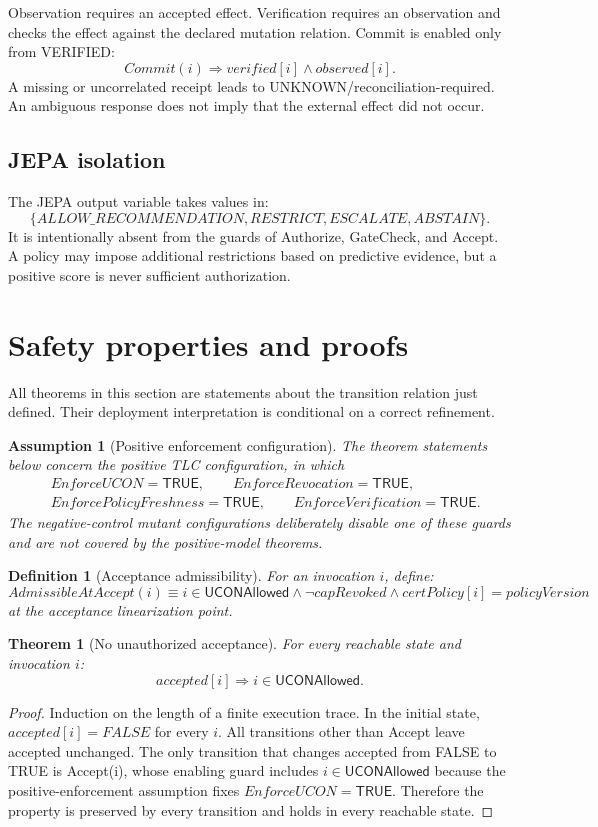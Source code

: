 \documentclass[11pt,a4paper]{article}
\newtheorem{definition}{Definition}[section]
\newtheorem{assumption}{Assumption}[section]
\newtheorem{theorem}{Theorem}[section]
\theoremstyle{remark}
\newcommand{\UCONAllowed}{\mathsf{UCONAllowed}}
\begin{document}
Observation requires an accepted effect. Verification requires an observation and checks the effect against the declared mutation relation. Commit is enabled only from VERIFIED:
\[
Commit(i)\Rightarrow verified[i]\land observed[i].
\]
A missing or uncorrelated receipt leads to UNKNOWN/reconciliation-required. An ambiguous response does not imply that the external effect did not occur.

\subsection{JEPA isolation}

The JEPA output variable takes values in:
\[
\{ALLOW\_RECOMMENDATION,RESTRICT,ESCALATE,ABSTAIN\}.
\]
It is intentionally absent from the guards of Authorize, GateCheck, and Accept. A policy may impose additional restrictions based on predictive evidence, but a positive score is never sufficient authorization.

\section{Safety properties and proofs}

All theorems in this section are statements about the transition relation just defined. Their deployment interpretation is conditional on a correct refinement.

\begin{assumption}[Positive enforcement configuration]
The theorem statements below concern the positive TLC configuration, in which
\[
\begin{split}
&EnforceUCON=\mathsf{TRUE},\qquad
EnforceRevocation=\mathsf{TRUE},\\
&EnforcePolicyFreshness=\mathsf{TRUE},\qquad
EnforceVerification=\mathsf{TRUE}.
\end{split}
\]
The negative-control mutant configurations deliberately disable one of these guards and are not covered by the positive-model theorems.
\end{assumption}

\begin{definition}[Acceptance admissibility]
For an invocation $i$, define:
\[
AdmissibleAtAccept(i)\equiv
i\in\UCONAllowed\land\neg capRevoked
\land certPolicy[i]=policyVersion
\]
at the acceptance linearization point.
\end{definition}

\begin{theorem}[No unauthorized acceptance]
For every reachable state and invocation $i$:
\[
accepted[i]\Rightarrow i\in\UCONAllowed.
\]
\end{theorem}
\begin{proof}
Induction on the length of a finite execution trace. In the initial state, $accepted[i]=FALSE$ for every $i$. All transitions other than Accept leave accepted unchanged. The only transition that changes accepted from FALSE to TRUE is Accept(i), whose enabling guard includes $i\in\UCONAllowed$ because the positive-enforcement assumption fixes $EnforceUCON=\mathsf{TRUE}$. Therefore the property is preserved by every transition and holds in every reachable state.
\end{proof}
\end{document}
